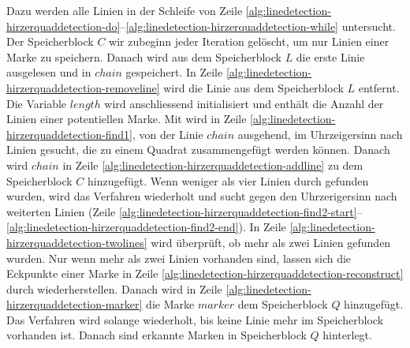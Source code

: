 

Dazu werden alle Linien in der Schleife von Zeile
 \ref{alg:linedetection-hirzerquaddetection-do}--\ref{alg:linedetection-hirzerquaddetection-while} untersucht. Der
 Speicherblock $C$ wir zubeginn jeder Iteration gelöscht, um nur Linien einer Marke zu speichern. Danach wird aus dem
 Speicherblock $L$ die erste Linie ausgelesen und in $\mathit{chain}$ gespeichert. In Zeile
 \ref{alg:linedetection-hirzerquaddetection-removeline} wird die Linie aus dem Speicherblock $L$ entfernt. Die Variable
 $\mathit{length}$ wird anschliessend initialisiert und enthält die Anzahl der Linien einer potentiellen Marke. Mit
  wird in Zeile \ref{alg:linedetection-hirzerquaddetection-find1}, von der Linie
 $\mathit{chain}$ ausgehend, im Uhrzeigersinn nach Linien gesucht, die zu einem Quadrat zusammengefügt werden können.
 Danach wird $\mathit{chain}$ in Zeile \ref{alg:linedetection-hirzerquaddetection-addline} zu dem Speicherblock $C$
 hinzugefügt. Wenn weniger als vier Linien durch  gefunden wurden, wird das Verfahren
 wiederholt und sucht gegen den Uhrzerigersinn nach weiterten Linien (Zeile
 \ref{alg:linedetection-hirzerquaddetection-find2-start}--\ref{alg:linedetection-hirzerquaddetection-find2-end}). In
 Zeile \ref{alg:linedetection-hirzerquaddetection-twolines} wird überprüft, ob mehr als zwei Linien gefunden wurden.
 Nur wenn mehr als zwei Linien vorhanden sind, lassen sich die Eckpunkte einer Marke in Zeile
 \ref{alg:linedetection-hirzerquaddetection-reconstruct} durch  wiederherstellen. Danach
 wird in Zeile \ref{alg:linedetection-hirzerquaddetection-marker} die Marke $\mathit{marker}$ dem Speicherblock $Q$
 hinzugefügt. Das Verfahren wird solange wiederholt, bis keine Linie mehr im Speicherblock vorhanden ist. Danach sind
 erkannte Marken in Speicherblock $Q$ hinterlegt.
